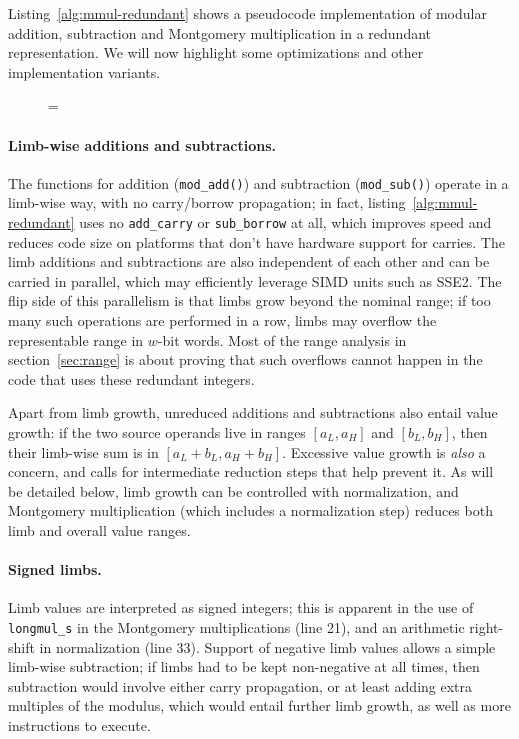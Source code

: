 \documentclass{llncs}
\newenvironment{forbidpagebreak}
    {\par\nobreak\vfil\penalty 0\vfilneg
     \vtop\bgroup}
    {\par\xdef\tpd{\the\prevdepth}\egroup
     \prevdepth=\tpd}
\begin{document}
Listing~\ref{alg:mmul-redundant} shows a pseudocode implementation of
modular addition, subtraction and Montgomery multiplication in a redundant
representation. We will now highlight some optimizations and other
implementation variants.

\begin{figure}
\begin{forbidpagebreak}

\end{forbidpagebreak}
\end{figure}

\paragraph{Limb-wise additions and subtractions.}
The functions for addition (\verb+mod_add()+) and subtraction
(\verb+mod_sub()+) operate in a limb-wise way, with no carry/borrow
propagation; in fact, listing~\ref{alg:mmul-redundant} uses no
\verb+add_carry+ or \verb+sub_borrow+ at all, which improves speed and
reduces code size on platforms that don't have hardware support for
carries. The limb additions and subtractions are also independent of
each other and can be carried in parallel, which may efficiently
leverage SIMD units such as SSE2. The flip side of this parallelism is
that limbs grow beyond the nominal range; if too many such operations
are performed in a row, limbs may overflow the representable range in
$w$-bit words. Most of the range analysis in section~\ref{sec:range} is
about proving that such overflows cannot happen in the code that uses
these redundant integers.

Apart from limb growth, unreduced additions and subtractions also entail
value growth: if the two source operands live in ranges $[a_L, a_H]$ and
$[b_L, b_H]$, then their limb-wise sum is in $[a_L + b_L, a_H + b_H]$.
Excessive value growth is \emph{also} a concern, and calls for
intermediate reduction steps that help prevent it. As will be detailed
below, limb growth can be controlled with normalization, and Montgomery
multiplication (which includes a normalization step) reduces both limb
and overall value ranges.

\paragraph{Signed limbs.}
Limb values are interpreted as signed integers; this is apparent in the
use of \verb+longmul_s+ in the Montgomery multiplications (line 21), and
an arithmetic right-shift in normalization (line 33). Support of
negative limb values allows a simple limb-wise subtraction; if limbs had
to be kept non-negative at all times, then subtraction would involve
either carry propagation, or at least adding extra multiples of the
modulus, which would entail further limb growth, as well as more
instructions to execute.
\end{document}
